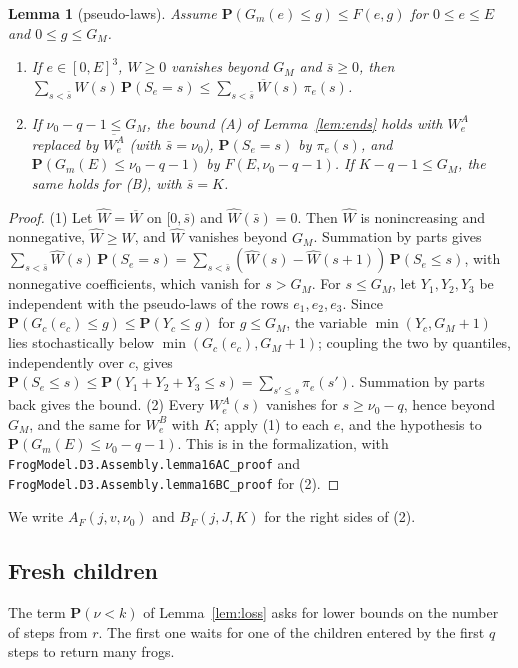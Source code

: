 \documentclass[11pt]{amsart}
\newtheorem{lemma}[theorem]{Lemma}
\theoremstyle{definition}
\numberwithin{equation}{section}
\newcommand{\lean}[1]{\ignorespaces}
\renewcommand{\P}{\mathbf{P}}
\begin{document}
\begin{lemma}[pseudo-laws]\label{lem:pseudo}\lean{FrogModel.D3.Assembly.lemma16C_proof, FrogModel.D3.Iface.lemma16C, FrogModel.D3.Assembly.lemma16AC_proof, FrogModel.D3.Assembly.lemma16BC_proof, FrogModel.D3.Iface.lemma16AC, FrogModel.D3.Iface.lemma16BC, FrogModel.D3.Iface.boundA, FrogModel.D3.Iface.boundB}
Assume $\P(G_m(e)\le g)\le F(e,g)$ for $0\le e\le E$ and $0\le g\le G_M$.
\begin{enumerate}
\item If $e\in[0,E]^3$, $W\ge0$ vanishes beyond $G_M$ and $\bar s\ge0$, then $\sum_{s<\bar s}W(s)\,\P(S_e=s)\le\sum_{s<\bar s}\overline W(s)\,\pi_e(s)$.
\item If $\nu_0-q-1\le G_M$, the bound (A) of Lemma~\ref{lem:ends} holds with $W^A_e$ replaced by $\overline{W^A_e}$ (with $\bar s=\nu_0$), $\P(S_e=s)$ by $\pi_e(s)$, and $\P(G_m(E)\le \nu_0-q-1)$ by $F(E,\nu_0-q-1)$. If $K-q-1\le G_M$, the same holds for (B), with $\bar s=K$.
\end{enumerate}
\end{lemma}

\begin{proof}
(1) Let $\widehat W=\overline W$ on $[0,\bar s)$ and $\widehat W(\bar s)=0$. Then $\widehat W$ is nonincreasing and nonnegative, $\widehat W\ge W$, and $\widehat W$ vanishes beyond $G_M$. Summation by parts gives $\sum_{s<\bar s}\widehat W(s)\,\P(S_e=s)=\sum_{s<\bar s}(\widehat W(s)-\widehat W(s+1))\,\P(S_e\le s)$, with nonnegative coefficients, which vanish for $s>G_M$. For $s\le G_M$, let $Y_1,Y_2,Y_3$ be independent with the pseudo-laws of the rows $e_1,e_2,e_3$. Since $\P(G_c(e_c)\le g)\le\P(Y_c\le g)$ for $g\le G_M$, the variable $\min(Y_c,G_M+1)$ lies stochastically below $\min(G_c(e_c),G_M+1)$; coupling the two by quantiles, independently over $c$, gives $\P(S_e\le s)\le\P(Y_1+Y_2+Y_3\le s)=\sum_{s'\le s}\pi_e(s')$. Summation by parts back gives the bound. (2) Every $W^A_e(s)$ vanishes for $s\ge \nu_0-q$, hence beyond $G_M$, and the same for $W^B_e$ with $K$; apply (1) to each $e$, and the hypothesis to $\P(G_m(E)\le \nu_0-q-1)$. This is  in the formalization, with \texttt{FrogModel.D3.Assembly.lemma16AC\_proof} and \texttt{FrogModel.D3.Assembly.lemma16BC\_proof} for (2).
\end{proof}

We write $A_F(j,v,\nu_0)$ and $B_F(j,J,K)$ for the right sides of (2).

\subsection*{Fresh children}
The term $\P(\nu<k)$ of Lemma~\ref{lem:loss} asks for lower bounds on the number of steps from $r$. The first one waits for one of the children entered by the first $q$ steps to return many frogs.
\end{document}
